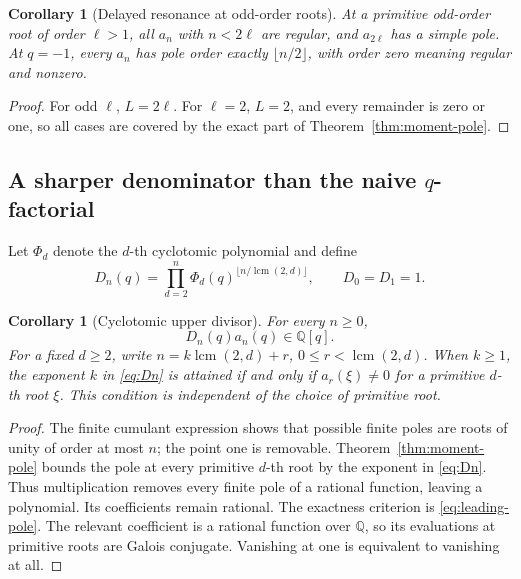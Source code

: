 \documentclass[11pt,a4paper]{article}
\numberwithin{equation}{section}
\newtheorem{corollary}[theorem]{Corollary}
\theoremstyle{definition}
\theoremstyle{remark}
\newcommand{\Q}{\mathbb Q}
\newcommand{\lcm}{\operatorname{lcm}}
\begin{document}
\begin{corollary}[Delayed resonance at odd-order roots]\label{cor:odd-root}
At a primitive odd-order root of order \(\ell>1\), all \(a_n\) with \(n<2\ell\) are regular, and \(a_{2\ell}\) has a simple pole. At \(q=-1\), every \(a_n\) has pole order exactly \(\lfloor n/2\rfloor\), with order zero meaning regular and nonzero.
\end{corollary}
\begin{proof}
For odd \(\ell\), \(L=2\ell\). For \(\ell=2\), \(L=2\), and every remainder is zero or one, so all cases are covered by the exact part of Theorem~\ref{thm:moment-pole}.
\end{proof}

\subsection{A sharper denominator than the naive \texorpdfstring{\(q\)}{q}-factorial}
Let \(\Phi_d\) denote the \(d\)-th cyclotomic polynomial and define
\begin{equation}\label{eq:Dn}
 D_n(q)=\prod_{d=2}^n
 \Phi_d(q)^{\lfloor n/\lcm(2,d)\rfloor},
 \qquad D_0=D_1=1.
\end{equation}

\begin{corollary}[Cyclotomic upper divisor]\label{cor:denominator}
For every \(n\ge0\),
\begin{equation}\label{eq:denominator-bound}
 D_n(q)a_n(q)\in\Q[q].
\end{equation}
For a fixed \(d\ge2\), write \(n=k\lcm(2,d)+r\), \(0\le r<\lcm(2,d)\). When \(k\ge1\), the exponent \(k\) in \eqref{eq:Dn} is attained if and only if \(a_r(\xi)\ne0\) for a primitive \(d\)-th root \(\xi\). This condition is independent of the choice of primitive root.
\end{corollary}
\begin{proof}
The finite cumulant expression shows that possible finite poles are roots of unity of order at most \(n\); the point one is removable. Theorem~\ref{thm:moment-pole} bounds the pole at every primitive \(d\)-th root by the exponent in \eqref{eq:Dn}. Thus multiplication removes every finite pole of a rational function, leaving a polynomial. Its coefficients remain rational. The exactness criterion is \eqref{eq:leading-pole}. The relevant coefficient is a rational function over \(\Q\), so its evaluations at primitive roots are Galois conjugate. Vanishing at one is equivalent to vanishing at all.
\end{proof}
\end{document}
